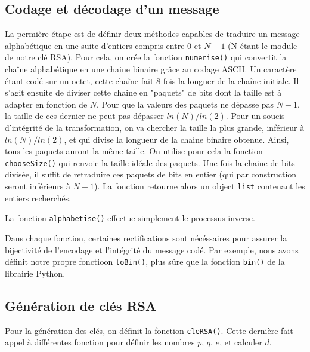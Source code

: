 \documentclass[titlepage]{article}
\begin{document}
    \subsection{Codage et décodage d'un message}
    La permière étape est de définir deux méthodes capables de traduire un message alphabétique en une suite d'entiers compris entre $0$ et $N-1$ (N étant le module de notre clé RSA).
    Pour cela, on crée la fonction \texttt{numerise()} qui convertit la chaîne alphabétique en une chaine binaire grâce au codage ASCII. Un caractère étant codé sur un octet, cette chaîne fait 8 fois la longuer de la chaîne initiale.
    Il s'agit ensuite de diviser cette chaine en "paquets" de bits dont la taille est à adapter en fonction de $N$.
    Pour que la valeurs des paquets ne dépasse pas $N-1$, la taille de ces dernier ne peut pas dépasser $ln(N)/ln(2)$. Pour un soucis d'intégrité de la transformation, on va chercher la taille la plus grande, inférieur à $ln(N)/ln(2)$, et qui divise la longueur de la chaine binaire obtenue.
    Ainsi, tous les paquets auront la même taille. On utilise pour cela la fonction \texttt{chooseSize()} qui renvoie la taille idéale des paquets.
    Une fois la chaine de bits divisée, il suffit de retraduire ces paquets de bits en entier (qui par construction seront inférieurs à $N-1$).
    La fonction retourne alors un object \texttt{list} contenant les entiers recherchés.

    

    La fonction \texttt{alphabetise()} effectue simplement le processus inverse.
    
    

    Dans chaque fonction, certaines rectifications sont nécéssaires pour assurer la bijectivité de l'encodage et l'intégrité du message codé. Par exemple, nous avons définit notre propre fonctioon \texttt{toBin()}, plus sûre que la fonction \texttt{bin()} de la librairie Python. 

    \subsection{Génération de clés RSA}
    Pour la génération des clés, on définit la fonction \texttt{cleRSA()}. Cette dernière fait appel à différentes fonction pour définir les nombres $p$, $q$, $e$, et calculer $d$.

    
\end{document}
